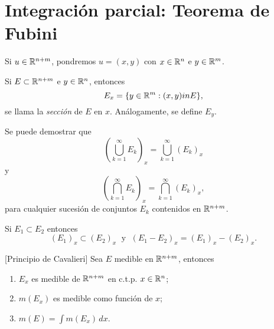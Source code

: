                             \section{Integraci\'on parcial: Teorema de Fubini}
                            
        Si $u \in \mathbb{R}^{n+m}$, pondremos $u=(x,y)$
        con $x \in \mathbb{R}^n$ e $y \in \mathbb{R}^m$. 
        
        Si $E\subset \mathbb{R}^{n+m}$ e $y\in \mathbb{R}^n$, entonces
        \[
        E_x=\{y \in \mathbb{R}^m: (x,y)in E\},
        \]
        se llama la \emph{secci\'on} de $E$ en $x$.
                An\'alogamente, se define $E_y$.
        
        Se puede demostrar que 
        \[
        \left(\bigcup\limits_{k=1}^{\infty} E_k \right)_x
        = \bigcup\limits_{k=1}^{\infty} \left(E_k\right)_x\]
        y
        \[
        \left(\bigcap\limits_{k=1}^{\infty} E_k \right)_x
        = \bigcap\limits_{k=1}^{\infty} \left(E_k\right)_x,\]
        para cualquier sucesi\'on de conjuntos $E_k$ contenidos en $\mathbb{R}^{n+m}$. 
        
        Si $E_1\subset E_2$ entonces 
        \[
        \left(E_1\right)_x  \subset   \left(E_2\right)_x   
       \; \mbox{ y }\;
        \left(E_1-E_2\right)_x=\left(E_1\right)_x -\left(E_2\right)_x.
        \]
        
        \begin{teorema}{}[Principio de Cavalieri]
        Sea $E$ medible en $\mathbb{R}^{n+m}$, entonces
        \begin{enumerate}
            \item $E_x$ es medible de $\mathbb{R}^{n+m}$ en c.t.p. $x \in \mathbb{R}^n$;
            \item $m\left(E_x\right)$ es medible como funci\'on de $x$;
            \item $m(E)=\int m\left(E_x\right)\, dx$.
        \end{enumerate}
        \end{teorema}
        
